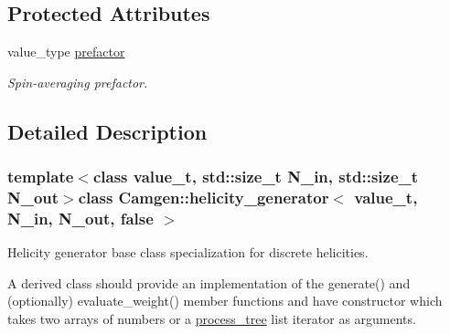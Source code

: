 \subsection*{Protected Attributes}
\begin{DoxyCompactItemize}
\item 
\hypertarget{a00267_aabfd768deccb37d34c66bd67ab6e6b5b}{value\-\_\-type \hyperlink{a00267_aabfd768deccb37d34c66bd67ab6e6b5b}{prefactor}}\label{a00267_aabfd768deccb37d34c66bd67ab6e6b5b}

\begin{DoxyCompactList}\small\item\em Spin-\/averaging prefactor. \end{DoxyCompactList}\end{DoxyCompactItemize}


\subsection{Detailed Description}
\subsubsection*{template$<$class value\-\_\-t, std\-::size\-\_\-t N\-\_\-in, std\-::size\-\_\-t N\-\_\-out$>$class Camgen\-::helicity\-\_\-generator$<$ value\-\_\-t, N\-\_\-in, N\-\_\-out, false $>$}

Helicity generator base class specialization for discrete helicities. 

A derived class should provide an implementation of the generate() and (optionally) evaluate\-\_\-weight() member functions and have constructor which takes two arrays of numbers or a \hyperlink{a00431}{process\-\_\-tree} list iterator as arguments. 

